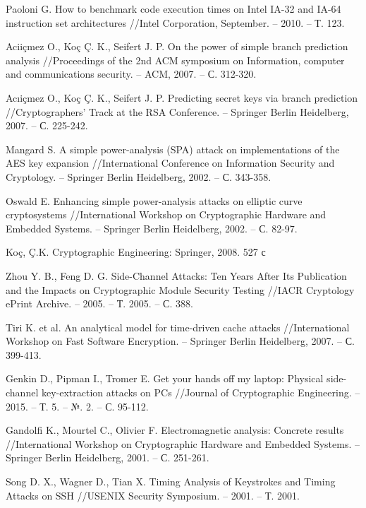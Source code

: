 \begin{thebibliography}{00}
  Paoloni G. How to benchmark code execution times on Intel IA-32 and IA-64 instruction set architectures //Intel Corporation, September. – 2010. – Т. 123.

  Aciiçmez O., Koç Ç. K., Seifert J. P. On the power of simple branch prediction analysis //Proceedings of the 2nd ACM symposium on Information, computer and communications security. – ACM, 2007. – С. 312-320.

  Acıiçmez O., Koç Ç. K., Seifert J. P. Predicting secret keys via branch prediction //Cryptographers’ Track at the RSA Conference. – Springer Berlin Heidelberg, 2007. – С. 225-242.

  Mangard S. A simple power-analysis (SPA) attack on implementations of the AES key expansion //International Conference on Information Security and Cryptology. – Springer Berlin Heidelberg, 2002. – С. 343-358.

  Oswald E. Enhancing simple power-analysis attacks on elliptic curve cryptosystems //International Workshop on Cryptographic Hardware and Embedded Systems. – Springer Berlin Heidelberg, 2002. – С. 82-97.

  Ko{\c{c}}, \c{C}.K. Cryptographic Engineering: Springer, 2008. 527 с

  Zhou Y. B., Feng D. G. Side-Channel Attacks: Ten Years After Its Publication and the Impacts on Cryptographic Module Security Testing //IACR Cryptology ePrint Archive. – 2005. – Т. 2005. – С. 388.

  Tiri K. et al. An analytical model for time-driven cache attacks //International Workshop on Fast Software Encryption. – Springer Berlin Heidelberg, 2007. – С. 399-413.

  Genkin D., Pipman I., Tromer E. Get your hands off my laptop: Physical side-channel key-extraction attacks on PCs //Journal of Cryptographic Engineering. – 2015. – Т. 5. – №. 2. – С. 95-112. 

  Gandolfi K., Mourtel C., Olivier F. Electromagnetic analysis: Concrete results //International Workshop on Cryptographic Hardware and Embedded Systems. – Springer Berlin Heidelberg, 2001. – С. 251-261.

  Song D. X., Wagner D., Tian X. Timing Analysis of Keystrokes and Timing Attacks on SSH //USENIX Security Symposium. – 2001. – Т. 2001. 

\end{thebibliography}
\endgroup

\clearpage
